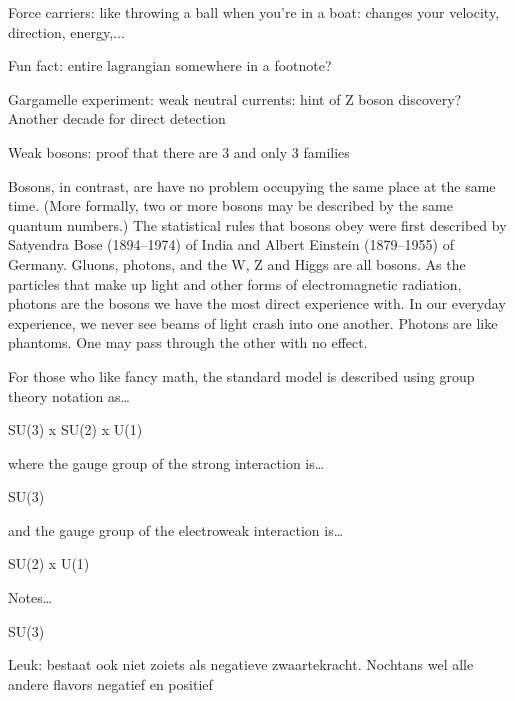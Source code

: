 Force carriers: like throwing a ball when you're in a boat: changes your velocity, direction, energy,...

Fun fact: entire lagrangian somewhere in a footnote?

Gargamelle experiment: weak neutral currents: hint of Z boson discovery? Another decade for direct detection

Weak bosons: proof that there are 3 and only 3 families

Bosons, in contrast, are have no problem occupying the same place at the same time. (More formally, two or more bosons may be described by the same quantum numbers.) The statistical rules that bosons obey were first described by Satyendra Bose (1894–1974) of India and Albert Einstein (1879–1955) of Germany. Gluons, photons, and the W, Z and Higgs are all bosons. As the particles that make up light and other forms of electromagnetic radiation, photons are the bosons we have the most direct experience with. In our everyday experience, we never see beams of light crash into one another. Photons are like phantoms. One may pass through the other with no effect.



For those who like fancy math, the standard model is described using group theory notation as…

SU(3) x SU(2) x U(1)

where the gauge group of the strong interaction is…

SU(3)

and the gauge group of the electroweak interaction is…

SU(2) x U(1)

Notes…

SU(3)

\begin{comment}
3rd order special unitary group
the set of all 3 x 3 unitary matrices with unit determinant
SU(2)
2nd order special unitary group
the set of all 2 x 2 unitary matrices with unit determinant
isomorphic to the group of quaternions of absolute value 1, {x ∈ ℍ: |x| =1}
diffeomorphic to a hypersphere (3-sphere)
homomorphic to the rotation group SO(3), the set of all rotations about the origin in ordinary three dimensional euclidean space
U(1)
1st order unitary group
the set of all 1 × 1 unitary matrices
isomorphic to the circle group, the multiplicative group of complex numbers with absolute value 1, T = {x ∈ ℂ: |x| =1}
isomorphic to SO(2), the second order special orthogonal group
What is this? The Standard Model Lagrangian.

ℒ = −¼FμνFμν + iψ̄D̸ψ + ψiyijψjφ + h.c. + |Dμφ|2 − V(φ)
\end{comment}

Leuk: bestaat ook niet zoiets als negatieve zwaartekracht. Nochtans wel alle andere flavors negatief en positief

